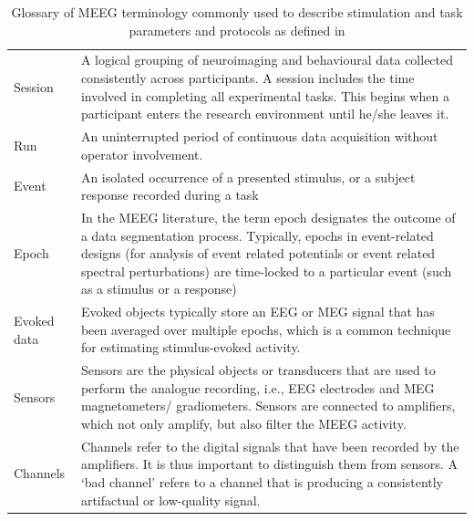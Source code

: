 \begin{table}[ht]
    \caption{Glossary of MEEG terminology commonly used to describe stimulation and task parameters and protocols as defined in \cite{pernet2018best}}
    \centering
    \begin{tabular}{@{}| p{3cm}|p{10cm}| @{}}
        \hline
        Session      & A logical grouping of neuroimaging and behavioural data collected consistently across participants. A session includes the time involved in completing all experimental tasks. This begins when a participant enters the research environment until he/she leaves it.                                                    \\
        Run          & An uninterrupted period of continuous data acquisition without operator involvement.                                                                                                                                                                                                                                     \\
        Event        & An isolated occurrence of a presented stimulus, or a subject response recorded during a task                                                                                                                                                                                                                             \\
        Epoch        & In the MEEG literature, the term epoch designates the outcome of a data segmentation process. Typically, epochs in event-related designs (for analysis of event related potentials or event related spectral perturbations) are time-locked to a particular event (such as a stimulus or a response)                     \\
        Evoked data  & Evoked objects typically store an EEG or MEG signal that has been averaged over multiple epochs, which is a common technique for estimating stimulus-evoked activity.                                                                                                                                                    \\
        Sensors      & Sensors are the physical objects or transducers that are used to perform the analogue recording, i.e., EEG electrodes and MEG magnetometers/ gradiometers. Sensors are connected to amplifiers, which not only amplify, but also filter the MEEG activity.                                                               \\
        Channels     & Channels refer to the digital signals that have been recorded by the amplifiers. It is thus important to distinguish them from sensors. A ‘bad channel’ refers to a channel that is producing a consistently artifactual or low-quality signal.                                                                          \\

\end{tabular}
\end{table}
